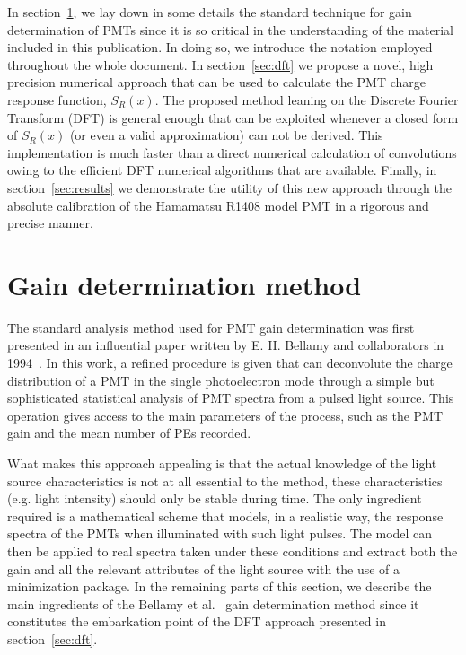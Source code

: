 \documentclass[a4paper,11pt]{article}
\begin{document}
In section~\ref{sec:deconv}, we lay down in some details the standard technique for gain determination of PMTs since it is so critical in the understanding of the material included in this publication. 
In doing so, we introduce the notation employed throughout the whole document. 
In section~\ref{sec:dft} we propose a novel, high precision numerical approach that can be used to calculate the PMT charge response function, $S_R(x)$. %
The proposed method leaning on the Discrete Fourier Transform (DFT) is general enough that can be exploited whenever a closed form of $S_R(x)$ (or even a valid approximation) can not be derived.
This implementation is much faster than a direct numerical calculation of convolutions owing to the efficient DFT numerical algorithms that are available. 
Finally, in section~\ref{sec:results} we demonstrate the utility of this new approach through the absolute calibration of the Hamamatsu R1408 model PMT in a rigorous and precise manner. 


\section{Gain determination method}
\label{sec:deconv}
%

The standard analysis method used for PMT gain determination was first presented in an influential paper written by E. H. Bellamy and collaborators in 1994~\cite{Bellamy}. 
In this work, a refined procedure is given that can deconvolute the charge distribution of a PMT in the single photoelectron mode through a simple but sophisticated statistical analysis of PMT spectra from a pulsed light source. 
This operation gives access to the main parameters of the process, such as the PMT gain and the mean number of PEs recorded.

What makes this approach appealing is that the actual knowledge of the light source characteristics is not at all essential to the method, these characteristics (e.g. light intensity) should only be stable during time.  
The only ingredient required is a mathematical scheme that models, in a realistic way, the response spectra of the PMTs when illuminated with such light pulses. 
The model can then be applied to real spectra taken under these conditions and extract both the gain and all the relevant attributes of the light source with the use of a minimization package. 
In the remaining parts of this section, we describe the main ingredients of the Bellamy et al.~\cite{Bellamy} gain determination method since it constitutes the embarkation point of the DFT approach presented in section~\ref{sec:dft}. 
\end{document}
